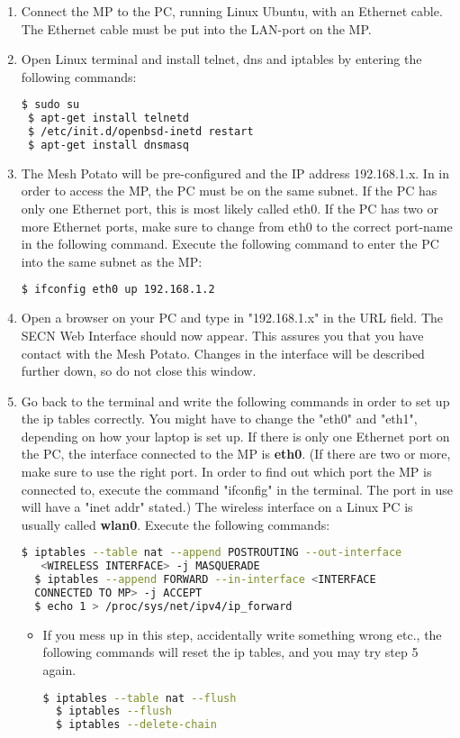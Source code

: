 

\begin{enumerate}
\item Connect the MP to the PC, running Linux Ubuntu, with an Ethernet cable. The Ethernet cable must be put into the LAN-port on the MP. 

\item Open Linux terminal and install telnet, dns and iptables by entering the following commands: 
\noindent
\begin{lstlisting}[language=bash]
 $ sudo su
 $ apt-get install telnetd
 $ /etc/init.d/openbsd-inetd restart 
 $ apt-get install dnsmasq
\end{lstlisting}

\item The Mesh Potato will be pre-configured and the IP address 192.168.1.x. In in order to access the MP, the PC must be on the same subnet. If the PC has only one Ethernet port, this is most likely called eth0. If the PC has two or more Ethernet ports, make sure to change from eth0 to the correct port-name in the following command. Execute the following command to enter the PC into the same subnet as the MP: 
\noindent
\begin{lstlisting}[language=bash]
  $ ifconfig eth0 up 192.168.1.2
\end{lstlisting}

\item Open a browser on your PC and type in "192.168.1.x" in the URL field. The SECN Web Interface should now appear. This assures you that you have contact with the Mesh Potato. Changes in the interface will be described further down, so do not close this window.  

\item Go back to the terminal and write the following commands in order to set up the ip tables correctly. You might have to change the "eth0" and "eth1", depending on how your laptop is set up. If there is only one Ethernet port on the PC, the interface connected to the MP is \textbf{eth0}. (If there are two or more, make sure to use the right port. In order to find out which port the MP is connected to, execute the command "ifconfig" in the terminal. The port in use will have a "inet addr" stated.) The wireless interface on a Linux PC is usually called \textbf{wlan0}. Execute the following commands: 
\noindent
\begin{lstlisting}[language=bash]
  $ iptables --table nat --append POSTROUTING --out-interface
   <WIRELESS INTERFACE> -j MASQUERADE
  $ iptables --append FORWARD --in-interface <INTERFACE 
  CONNECTED TO MP> -j ACCEPT
  $ echo 1 > /proc/sys/net/ipv4/ip_forward
\end{lstlisting} 
\begin{itemize}
\item If you mess up in this step, accidentally write something wrong etc., the following commands will reset the ip tables, and you may try step 5 again.
\noindent
\begin{lstlisting}[language=bash]
  $ iptables --table nat --flush
  $ iptables --flush
  $ iptables --delete-chain
\end{lstlisting}
\end{itemize}  


\end{enumerate}
